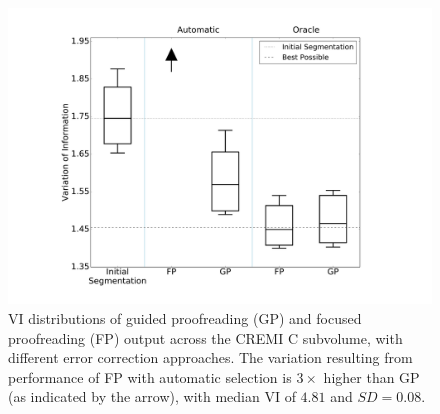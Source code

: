 \begin{figure}[t]
\centering
\includegraphics[width=\linewidth]{gfx/cremiCboxplot.pdf}
\caption{VI distributions of guided proofreading (GP) and focused proofreading (FP) output across the CREMI C subvolume, with different error correction approaches. The variation resulting from performance of FP with automatic selection is $3\times$ higher than GP (as indicated by the arrow), with median VI of $4.81$ and $SD=0.08$.}
\label{fig:cremiCboxplot}
\end{figure}